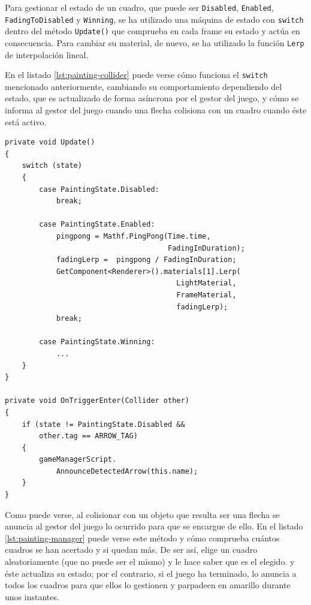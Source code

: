 Para gestionar el estado de un cuadro, que puede ser \texttt{Disabled}, \texttt{Enabled}, \texttt{FadingToDisabled} y \texttt{Winning}, se ha utilizado una máquina de estado con \texttt{switch} dentro del método \texttt{Update()} que comprueba en cada frame su estado y actúa en consecuencia. Para cambiar su material, de nuevo, se ha utilizado la función \texttt{Lerp} de interpolación lineal.

En el listado \ref{lst:painting-collider} puede verse cómo funciona el \texttt{switch} mencionado anteriormente, cambiando su comportamiento dependiendo del estado, que es actualizado de forma asíncrona por el gestor del juego, y cómo se informa al gestor del juego cuando una flecha colisiona con un cuadro cuando éste está activo.

\begin{lstlisting}[caption=Fragmento del script para actualizar un cuadro, label=lst:painting-collider]
private void Update()
{
    switch (state)
    {
        case PaintingState.Disabled:
            break;
        
        case PaintingState.Enabled:
            pingpong = Mathf.PingPong(Time.time, 
                                      FadingInDuration);
            fadingLerp =  pingpong / FadingInDuration;
            GetComponent<Renderer>().materials[1].Lerp(
                                        LightMaterial,
                                        FrameMaterial,
                                        fadingLerp);
            break;
    
        case PaintingState.Winning:
            ...
    }
}

private void OnTriggerEnter(Collider other)
{
    if (state != PaintingState.Disabled && 
        other.tag == ARROW_TAG)
    {
        gameManagerScript.
            AnnounceDetectedArrow(this.name);
    }
}
\end{lstlisting}

Como puede verse, al colisionar con un objeto que resulta ser una flecha se anuncia al gestor del juego lo ocurrido para que se encargue de ello. En el listado \ref{lst:painting-manager} puede verse este método y cómo comprueba cuántos cuadros se han acertado y si quedan más. De ser así, elige un cuadro aleatoriamente (que no puede ser el mismo) y le hace saber que es el elegido. y éste actualiza su estado; por el contrario, si el juego ha terminado, lo anuncia a todos los cuadros para que ellos lo gestionen y parpadeen en amarillo durante unos instantes.

